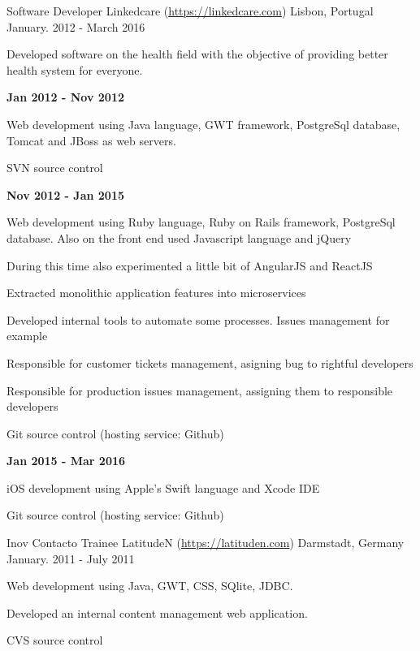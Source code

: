 \begin{cventries}
  \cventry
	{Software Developer} %
    {Linkedcare (\url{https://linkedcare.com}) } %
	{Lisbon, Portugal} %
	{January. 2012 - March 2016} %
	{
	 \begin{cvitems} %
	 	\item {Developed software on the health field with the objective of providing better health system for everyone.}
	 	\item{\textbf{Jan 2012 - Nov 2012}}
	 	\item{Web development using Java language, GWT framework, PostgreSql database, Tomcat and JBoss as web servers.}
	 	\item {SVN source control}
	 	\item{\textbf{Nov 2012 - Jan 2015}}
	 	\item{Web development using Ruby language, Ruby on Rails framework, PostgreSql database. Also on the front end used Javascript language and jQuery}
	 	\item{During this time also experimented a little bit of AngularJS and ReactJS}
	 	\item{Extracted monolithic application features into microservices}
	 	\item{Developed internal tools to automate some processes. Issues management for example}
	 	\item{Responsible for customer tickets management, asigning bug to rightful developers}
	 	\item{Responsible for production issues management, assigning them to responsible developers}
	 	\item {Git source control (hosting service: Github)}
	 	\item{\textbf{Jan 2015 - Mar 2016}}
	 	\item{iOS development using Apple's Swift language and Xcode IDE}
	 	\item {Git source control (hosting service: Github)}
	\end{cvitems}
	}

  \cventry
    {Inov Contacto Trainee } %
    {LatitudeN (\url{https://latituden.com}) } %
    {Darmstadt, Germany} %
    {January. 2011 - July 2011} %
    {
	\begin{cvitems} %
      	\item {Web development using Java, GWT, CSS, SQlite, JDBC.}
		\item {Developed an internal content management web application.}
		\item {CVS source control}
	\end{cvitems}
}

\end{cventries}
